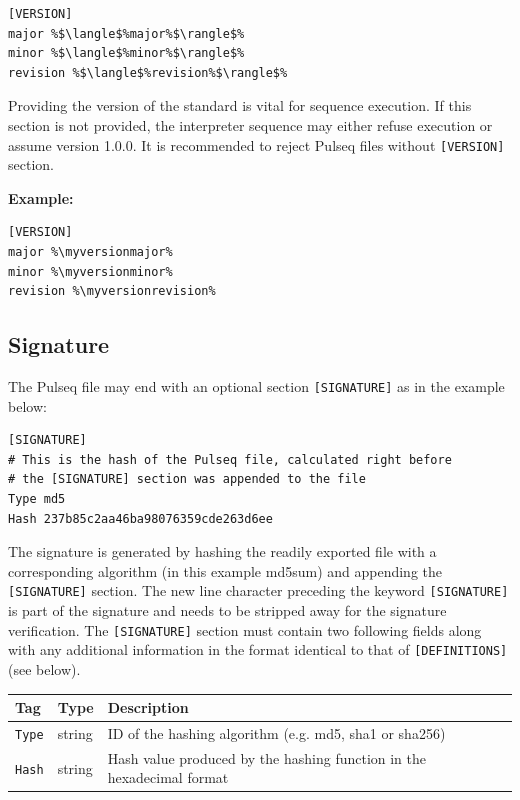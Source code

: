 \documentclass{article}
\def\myversionmajor{1}
\def\myversionminor{5}
\def\myversionrevision{3}
\begin{document}
\begin{lstlisting}[escapechar=\%]
[VERSION]
major %$\langle$%major%$\rangle$%
minor %$\langle$%minor%$\rangle$%
revision %$\langle$%revision%$\rangle$%
\end{lstlisting}

Providing the version of the standard is vital for sequence execution.
If this section is not provided, the interpreter sequence may either refuse execution or assume version 1.0.0. It is recommended to reject Pulseq files without \verb.[VERSION]. section.

\textbf{Example:}
\begin{lstlisting}[escapechar=\%]
[VERSION]
major %\myversionmajor%
minor %\myversionminor%
revision %\myversionrevision%
\end{lstlisting}

\subsection{Signature}

The Pulseq file may end with an optional section \verb.[SIGNATURE]. as in the example below:

\begin{lstlisting}[escapechar=\%]
[SIGNATURE]
# This is the hash of the Pulseq file, calculated right before 
# the [SIGNATURE] section was appended to the file
Type md5
Hash 237b85c2aa46ba98076359cde263d6ee
\end{lstlisting}

The signature is generated by hashing the readily exported file with a corresponding algorithm (in this example md5sum) and appending the \verb.[SIGNATURE]. section. The new line character preceding the keyword \verb.[SIGNATURE]. is part of the signature and needs to be stripped away for the signature verification. The \verb.[SIGNATURE]. section must contain two following fields along with any additional information in the format identical to that of \verb.[DEFINITIONS]. (see below). 

\begin{tabularx}{\textwidth}{llX}
\toprule
Tag & Type & Description\\
\midrule
\verb.Type. & string & ID of the hashing algorithm (e.g. md5, sha1 or sha256) \\
\verb.Hash. & string & Hash value produced by the hashing function in the hexadecimal format \\
\bottomrule
\end{tabularx}
\end{document}
